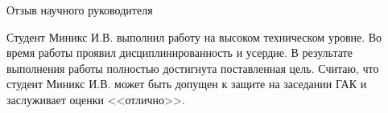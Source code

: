 \documentclass[utf8x, 14pt]{G7-32} %
\begin{document}
\thispagestyle{empty} 
\begin{center}
Отзыв научного руководителя

\end{center}

Студент Миникс И.В. выполнил работу на высоком техническом уровне. Во время работы проявил дисциплинированность и усердие.
В результате выполнения работы полностью достигнута поставленная цель.
Считаю, что студент Миникс И.В. может быть допущен к защите на заседании ГАК и заслуживает оценки <<отлично>>.
\end{document}
